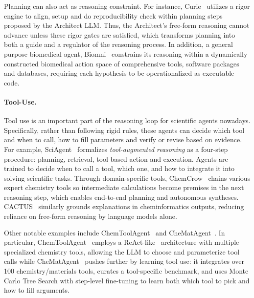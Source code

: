 Planning can also act as reasoning constraint. For instance, Curie~\cite{kon2025curierigorousautomatedscientific} utilizes a rigor engine to align, setup and do reproducibility check within planning steps proposed by the Architect LLM. Thus, the Architect's free-form reasoning cannot advance unless these rigor gates are satisfied, which transforms planning into both a guide and a regulator of the reasoning process. In addition, a general purpose biomedical agent, Biomni~\cite{huang2025biomni} constrains its reasoning within a dynamically constructed biomedical action space of comprehensive tools,  software packages and databases, requiring each hypothesis to be operationalized as executable code.


\paragraph{Tool-Use.}
\label{sec:app-science-tool}



Tool use is an important part of the reasoning loop for scientific agents nowadays. Specifically, rather than following rigid rules,   these agents can decide which tool and when to call, how to fill parameters and verify or revise based on evidence. For example, SciAgent~\cite{ma2024sciagenttoolaugmentedlanguagemodels} formalizes \textit{tool-augmented reasoning} as a four-step procedure: planning, retrieval, tool-based action and execution. Agents are trained to decide when to call a tool, which one, and how to integrate it into solving scientific tasks. Through domain-specific tools, ChemCrow~\cite{bran2023chemcrowaugmentinglargelanguagemodels} chains various expert chemistry tools so intermediate calculations become premises in the next reasoning step, which enables end-to-end planning and autonomous syntheses. CACTUS~\cite{mcnaughton2024cactus} similarly grounds explanations in cheminformatics outputs, reducing reliance on free-form reasoning by language models alone. 

Other notable examples include ChemToolAgent~\cite{yu2024chemtoolagent} and CheMatAgent~\cite{wu2025chematagentenhancingllmschemistry}. In particular, ChemToolAgent~\cite{yu2024chemtoolagent} employs a ReAct-like~\cite{yao2023react} architecture with multiple specialized chemistry tools, allowing the LLM to choose and parameterize tool calls while CheMatAgent~\cite{wu2025chematagentenhancingllmschemistry} pushes further by learning tool use: it integrates over 100 chemistry/materials tools, curates a tool-specific benchmark, and uses Monte Carlo Tree Search with step-level fine-tuning to learn both which tool to pick and how to fill arguments.


